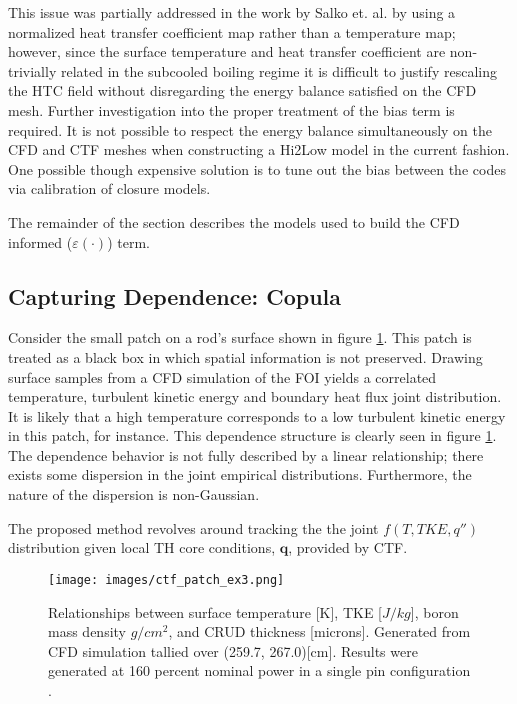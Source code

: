 This issue was partially addressed in the work by Salko et. al. by using a normalized heat transfer coefficient map rather than a temperature map; however, since the surface temperature and heat transfer coefficient are non-trivially related in the subcooled boiling regime it is difficult to justify rescaling the HTC field without disregarding the energy balance satisfied on the CFD mesh.  Further investigation into the proper treatment of the bias term is required.  It is not possible to respect the energy balance simultaneously on the CFD and CTF meshes when constructing a Hi2Low model in the current fashion.  One possible though expensive solution is to tune out the bias between the codes via calibration of closure models.

The remainder of the section describes the models used to build the CFD informed ($\varepsilon(\cdot)$) term.

\subsection{Capturing Dependence: Copula}

Consider the small patch on a rod's surface shown in figure \ref{fig:ctf_patch_dist}.  This patch is treated as a black box in which spatial information is not preserved. Drawing surface samples from a CFD simulation of the FOI yields a correlated temperature, turbulent kinetic energy and boundary heat flux joint distribution.  It is likely that a high temperature corresponds to a low turbulent kinetic energy in this patch, for instance.  This dependence structure is clearly seen in figure \ref{fig:ctf_patch_dist}.  The dependence behavior is not fully described by a linear relationship; there exists some dispersion in the joint empirical distributions.  Furthermore, the nature of the dispersion is non-Gaussian.  

The proposed method revolves around tracking the the joint $f(T, TKE, q'')$ distribution given local TH core conditions, $\mathbf q$, provided by CTF. \\

\begin{figure}[!htbp]
\centering
\texttt{[image: images/ctf\_patch\_ex3.png]}
\caption{Relationships between surface temperature [K], TKE [$J/kg$], boron mass density $g/cm^2$, and CRUD thickness [microns]. Generated from CFD simulation tallied over (259.7, 267.0)[cm]. Results were generated at 160 percent nominal power in a single pin configuration \cite{slattery16}.}
\label{fig:ctf_patch_dist}
\end{figure}

